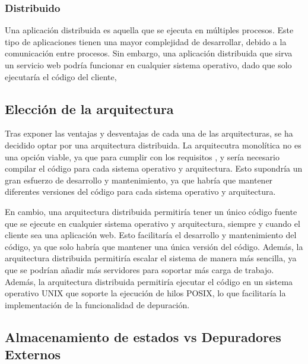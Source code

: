 \subsubsection{Distribuido} \label{subsubsec:distribuido}

Una \gls{aplicación distribuida} \cite {DistributedSystems} es aquella que se ejecuta en múltiples procesos. Este tipo de aplicaciones tienen una mayor complejidad de desarrollar, debido a la comunicación entre procesos. Sin embargo, una \gls{aplicación distribuida} que sirva un \gls{servicio web} podría funcionar en cualquier sistema operativo, dado que solo ejecutaría el código del cliente,

\subsection{Elección de la arquitectura} \label{subsec:eleccion-arquitectura}

Tras exponer las ventajas y desventajas de cada una de las arquitecturas, se ha decidido optar por una arquitectura distribuida. La arquitecutra monolítica no es una opción viable, ya que para cumplir con los requisitos ,  y  sería necesario compilar el código para cada sistema operativo y arquitectura. Esto supondría un gran esfuerzo de desarrollo y mantenimiento, ya que habría que mantener diferentes versiones del código para cada sistema operativo y arquitectura.

En cambio, una arquitectura distribuida permitiría tener un único código fuente que se ejecute en cualquier sistema operativo y arquitectura, siempre y cuando el cliente sea una \gls{aplicación web}. Esto facilitaría el desarrollo y mantenimiento del código, ya que solo habría que mantener una única versión del código. Además, la arquitectura distribuida permitiría escalar el sistema de manera más sencilla, ya que se podrían añadir más servidores para soportar más carga de trabajo.
Además, la arquitectura distribuida permitiría ejecutar el código en un sistema operativo UNIX que soporte la ejecución de \glspl{hilo} POSIX, lo que facilitaría la implementación de la funcionalidad de depuración.

\subsection{Almacenamiento de estados vs Depuradores Externos} \label{subsec:depuracion}

